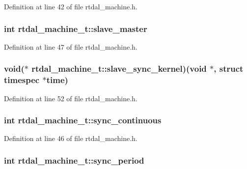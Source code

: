 Definition at line 42 of file rtdal\-\_\-machine.\-h.

\subsubsection[{slave\-\_\-master}]{\setlength{\rightskip}{0pt plus 5cm}int rtdal\-\_\-machine\-\_\-t\-::slave\-\_\-master}\label{structrtdal__machine__t_a6933855be619cf21e0b2d4846179795e}


Definition at line 47 of file rtdal\-\_\-machine.\-h.

\subsubsection[{slave\-\_\-sync\-\_\-kernel}]{\setlength{\rightskip}{0pt plus 5cm}void($\ast$ rtdal\-\_\-machine\-\_\-t\-::slave\-\_\-sync\-\_\-kernel)(void $\ast$, struct timespec $\ast$time)}\label{structrtdal__machine__t_ae38315c451db255d9108192ab2fbfe3d}


Definition at line 52 of file rtdal\-\_\-machine.\-h.

\subsubsection[{sync\-\_\-continuous}]{\setlength{\rightskip}{0pt plus 5cm}int rtdal\-\_\-machine\-\_\-t\-::sync\-\_\-continuous}\label{structrtdal__machine__t_a719bd75d0aa289f72a479c0346c6298b}


Definition at line 46 of file rtdal\-\_\-machine.\-h.

\subsubsection[{sync\-\_\-period}]{\setlength{\rightskip}{0pt plus 5cm}int rtdal\-\_\-machine\-\_\-t\-::sync\-\_\-period}\label{structrtdal__machine__t_a885449f1af2671677597b5b18cd05060}



